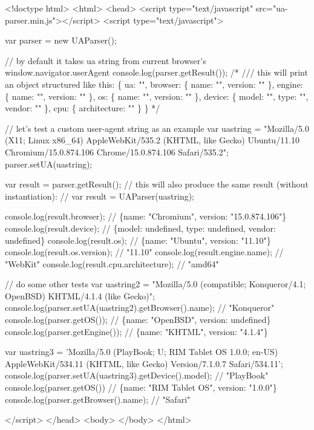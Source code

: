 \begin{DoxyCode}
<!doctype html>
<html>
<head>
<script type="text/javascript" src="ua-parser.min.js"></script>
<script type="text/javascript">

    var parser = new UAParser();

    // by default it takes ua string from current browser's window.navigator.userAgent
    console.log(parser.getResult());
    /*
        /// this will print an object structured like this:
        \{
            ua: "",
            browser: \{
                name: "",
                version: ""
            \},
            engine: \{
                name: "",
                version: ""
            \},
            os: \{
                name: "",
                version: ""
            \},
            device: \{
                model: "",
                type: "",
                vendor: ""
            \},
            cpu: \{
                architecture: ""
            \}
        \}
    */

    // let's test a custom user-agent string as an example
    var uastring = "Mozilla/5.0 (X11; Linux x86\_64) AppleWebKit/535.2 (KHTML, like Gecko) Ubuntu/11.10
       Chromium/15.0.874.106 Chrome/15.0.874.106 Safari/535.2";
    parser.setUA(uastring);

    var result = parser.getResult();
    // this will also produce the same result (without instantiation):
    // var result = UAParser(uastring);

    console.log(result.browser);        // \{name: "Chromium", version: "15.0.874.106"\}
    console.log(result.device);         // \{model: undefined, type: undefined, vendor: undefined\}
    console.log(result.os);             // \{name: "Ubuntu", version: "11.10"\}
    console.log(result.os.version);     // "11.10"
    console.log(result.engine.name);    // "WebKit"
    console.log(result.cpu.architecture);   // "amd64"

    // do some other tests
    var uastring2 = "Mozilla/5.0 (compatible; Konqueror/4.1; OpenBSD) KHTML/4.1.4 (like Gecko)";
    console.log(parser.setUA(uastring2).getBrowser().name); // "Konqueror"
    console.log(parser.getOS());                            // \{name: "OpenBSD", version: undefined\}
    console.log(parser.getEngine());                        // \{name: "KHTML", version: "4.1.4"\}

    var uastring3 = 'Mozilla/5.0 (PlayBook; U; RIM Tablet OS 1.0.0; en-US) AppleWebKit/534.11 (KHTML, like
       Gecko) Version/7.1.0.7 Safari/534.11';
    console.log(parser.setUA(uastring3).getDevice().model); // "PlayBook"
    console.log(parser.getOS())                             // \{name: "RIM Tablet OS", version: "1.0.0"\}
    console.log(parser.getBrowser().name);                  // "Safari"

</script>
</head>
<body>
</body>
</html>
\end{DoxyCode}


